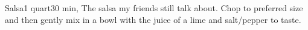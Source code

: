 \begin{recipe}{Salsa}{1 quart}{30 min, }
\freeform The salsa my friends still talk about.
Chop to preferred size and then gently mix in a bowl with the juice of a lime and salt/pepper to taste.

\end{recipe}
